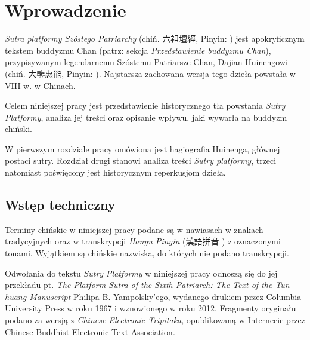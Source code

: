 \chapter*{Wprowadzenie}
\textit{Sutra platformy Szóstego Patriarchy} (chiń. 六祖壇經, Pinyin: ) jest apokryficznym tekstem buddyzmu Chan (patrz: sekcja \textit{Przedstawienie buddyzmu Chan}), przypisywanym legendarnemu Szóstemu Patriarsze Chan, Dajian Huinengowi (chiń. 大鑒惠能, Pinyin: ). Najstarsza zachowana wersja tego dzieła powstała w VIII w. w Chinach.

Celem niniejszej pracy jest przedstawienie historycznego tła powstania \textit{Sutry Platformy}, analiza jej treści oraz opisanie wpływu, jaki wywarła na buddyzm chiński.

W pierwszym rozdziale pracy omówiona jest hagiografia Huinenga, głównej postaci sutry.
Rozdział drugi stanowi analiza treści \textit{Sutry platformy}, trzeci natomiast poświęcony jest historycznym reperkusjom dzieła.

\section{Wstęp techniczny}
Terminy chińskie w niniejszej pracy podane są w nawiasach w znakach tradycyjnych oraz w transkrypcji \textit{Hanyu Pinyin} (漢語拼音 ) z oznaczonymi tonami. Wyjątkiem są chińskie nazwiska, do których nie podano transkrypcji.

Odwołania do tekstu \textit{Sutry Platformy} w niniejszej pracy odnoszą się do jej przekładu pt. \textit{The Platform Sutra of the Sixth Patriarch: The Text of the Tun-huang Manuscript} Philipa B. Yampolsky'ego, wydanego drukiem przez Columbia University Press w roku 1967 i wznowionego w roku 2012.
Fragmenty oryginału podano za wersją z \textit{Chinese Electronic Tripitaka}, opublikowaną w Internecie przez Chinese Buddhist Electronic Text Association.
%

